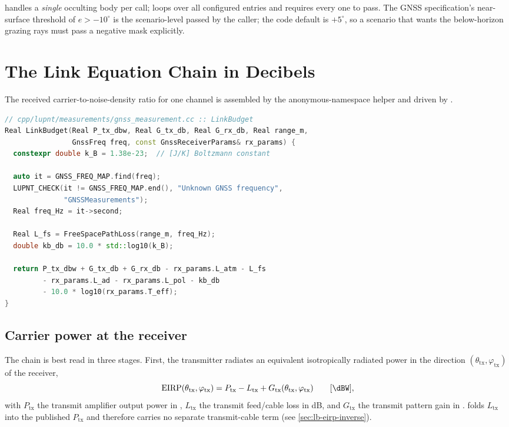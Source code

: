 \begin{lupntnote}
 handles a \emph{single} occulting body per call;
 loops over all configured  entries
and requires every one to pass.  The GNSS specification's near-surface
threshold of $e > -10^\circ$ is the scenario-level  passed
by the caller; the code default is $+5^\circ$, so a scenario that wants the
below-horizon grazing rays must pass a negative mask explicitly.
\end{lupntnote}

\section{The Link Equation Chain in Decibels}
\label{sec:lb-chain}

The received carrier-to-noise-density ratio for one channel is assembled by the
anonymous-namespace helper  and driven by
.

\begin{lstlisting}[language=cpp, caption={The link-budget accumulator.},
label={lst:lb-linkbudget}]
// cpp/lupnt/measurements/gnss_measurement.cc :: LinkBudget
Real LinkBudget(Real P_tx_dbw, Real G_tx_db, Real G_rx_db, Real range_m,
                GnssFreq freq, const GnssReceiverParams& rx_params) {
  constexpr double k_B = 1.38e-23;  // [J/K] Boltzmann constant

  auto it = GNSS_FREQ_MAP.find(freq);
  LUPNT_CHECK(it != GNSS_FREQ_MAP.end(), "Unknown GNSS frequency",
              "GNSSMeasurements");
  Real freq_Hz = it->second;

  Real L_fs = FreeSpacePathLoss(range_m, freq_Hz);
  double kb_db = 10.0 * std::log10(k_B);

  return P_tx_dbw + G_tx_db + G_rx_db - rx_params.L_atm - L_fs
         - rx_params.L_ad - rx_params.L_pol - kb_db
         - 10.0 * log10(rx_params.T_eff);
}
\end{lstlisting}

\subsection{Carrier power at the receiver}
\label{sec:lb-carrier}

The chain is best read in three stages.  First, the transmitter radiates an
equivalent isotropically radiated power in the direction
$(\theta_\mathrm{tx}, \varphi_\mathrm{tx})$ of the receiver,
\begin{equation}
  \mathrm{EIRP}(\theta_\mathrm{tx}, \varphi_\mathrm{tx})
  =
  P_\mathrm{tx}
  - L_\mathrm{tx}
  + G_\mathrm{tx}(\theta_\mathrm{tx}, \varphi_\mathrm{tx})
  \qquad [\si{\dBW}],
  \label{eq:lb-eirp}
\end{equation}
with $P_\mathrm{tx}$ the transmit amplifier output power in \si{\dBW},
$L_\mathrm{tx}$ the transmit feed/cable loss in \si{\dB}, and
$G_\mathrm{tx}$ the transmit pattern gain in \si{\dBi}.  \lupnt{} folds
$L_\mathrm{tx}$ into the published $P_\mathrm{tx}$ and therefore carries no
separate transmit-cable term (see \cref{sec:lb-eirp-inverse}).

